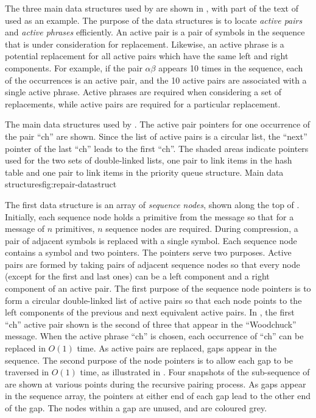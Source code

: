 
The three main data structures used by \repair are shown in
, with part of the text of 
 used as an example.  The purpose 
of the data structures is to
locate {\emph {active pairs}} and {\emph{active phrases}}
efficiently.  An active pair is a pair of symbols 
in the sequence that is under consideration for replacement.
Likewise, an active phrase is a potential 
replacement for all
active pairs which have the same left and right components.
For example, if the pair {$\alpha$$\beta$} appears 10 times
in the sequence, each of the occurrences is an
active pair, and the 10 active pairs are associated with a
single active phrase.  Active phrases are required when
considering a set of replacements, while active pairs are 
required for a particular replacement.

\fig{}
{The main data structures used by \repair.  The active pair
pointers for one occurrence of the pair ``ch'' are shown.  
Since the list of
active pairs is a circular list, the ``next'' pointer of the
last ``ch'' leads to the first ``ch''.  The shaded areas
indicate pointers used for the two sets of double-linked
lists, one pair to link items in the hash table and one 
pair to link items in the priority queue structure.}
{Main \repair data structures}{fig:repair-datastruct}

The first data structure is an array of {\emph {sequence nodes}},
shown along the top of .  Initially,
each sequence node holds a primitive from the message so that
for a message of $n$ primitives, $n$ sequence nodes are 
required.  During compression, a pair of adjacent symbols is replaced
with a single symbol.  Each sequence node contains 
a symbol and two pointers.  The pointers serve two purposes.  
Active pairs are formed by taking pairs of adjacent sequence nodes 
so that every node (except for the first and last ones) 
can be a left component and a right component of an active pair.
The first purpose of the sequence node pointers is to 
form a circular double-linked list of active pairs 
so that each node points to the left components of the previous 
and next equivalent active pairs.  In 
, the first ``ch'' active pair 
shown is the second of three that appear in the 
``Woodchuck'' message.  When the
active phrase ``ch'' is chosen, each occurrence of ``ch'' 
can be replaced in $O(1)$ time.  As active pairs are replaced,
gaps appear in the sequence.  The second purpose of the node
pointers is to allow each gap to be traversed in $O(1)$
time, as illustrated in .  
Four snapshots of the sub-sequence of 
 are shown at various points
during the recursive pairing process.
As gaps appear in the sequence array, the pointers at
either end of each gap lead to the other end of the gap.  The nodes
within a gap are unused, and are coloured grey.

